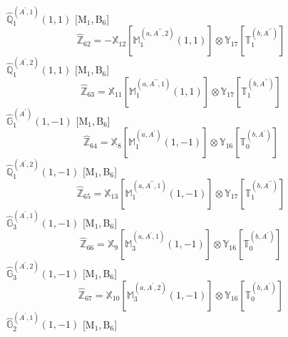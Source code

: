 \documentclass[fleqn,10pt,landscape]{article}
\begin{document}
\begin{itemize}
\begin{dmath*}
\end{dmath*}
\vspace{4mm}
\noindent {} $\,\,\,\hat{\mathbb{Q}}_{1}^{(A^{\prime},1)}(1,1)$ [M$_{1}$,\,B$_{6}$]
\begin{dmath*}
\hat{\mathbb{Z}}_{62}=- \mathbb{X}_{12}[\mathbb{M}_{1}^{(a,A^{\prime\prime},2)}(1,1)] \otimes\mathbb{Y}_{17}[\mathbb{T}_{1}^{(b,A^{\prime\prime})}]
\end{dmath*}
\vspace{4mm}
\noindent {} $\,\,\,\hat{\mathbb{Q}}_{1}^{(A^{\prime},2)}(1,1)$ [M$_{1}$,\,B$_{6}$]
\begin{dmath*}
\hat{\mathbb{Z}}_{63}=\mathbb{X}_{11}[\mathbb{M}_{1}^{(a,A^{\prime\prime},1)}(1,1)] \otimes\mathbb{Y}_{17}[\mathbb{T}_{1}^{(b,A^{\prime\prime})}]
\end{dmath*}
\vspace{4mm}
\noindent {} $\,\,\,\hat{\mathbb{G}}_{1}^{(A^{\prime})}(1,-1)$ [M$_{1}$,\,B$_{6}$]
\begin{dmath*}
\hat{\mathbb{Z}}_{64}=\mathbb{X}_{8}[\mathbb{M}_{1}^{(a,A^{\prime})}(1,-1)] \otimes\mathbb{Y}_{16}[\mathbb{T}_{0}^{(b,A^{\prime})}]
\end{dmath*}
\vspace{4mm}
\noindent {} $\,\,\,\hat{\mathbb{Q}}_{1}^{(A^{\prime},2)}(1,-1)$ [M$_{1}$,\,B$_{6}$]
\begin{dmath*}
\hat{\mathbb{Z}}_{65}=\mathbb{X}_{13}[\mathbb{M}_{1}^{(a,A^{\prime\prime},1)}(1,-1)] \otimes\mathbb{Y}_{17}[\mathbb{T}_{1}^{(b,A^{\prime\prime})}]
\end{dmath*}
\vspace{4mm}
\noindent {} $\,\,\,\hat{\mathbb{G}}_{3}^{(A^{\prime},1)}(1,-1)$ [M$_{1}$,\,B$_{6}$]
\begin{dmath*}
\hat{\mathbb{Z}}_{66}=\mathbb{X}_{9}[\mathbb{M}_{3}^{(a,A^{\prime},1)}(1,-1)] \otimes\mathbb{Y}_{16}[\mathbb{T}_{0}^{(b,A^{\prime})}]
\end{dmath*}
\vspace{4mm}
\noindent {} $\,\,\,\hat{\mathbb{G}}_{3}^{(A^{\prime},2)}(1,-1)$ [M$_{1}$,\,B$_{6}$]
\begin{dmath*}
\hat{\mathbb{Z}}_{67}=\mathbb{X}_{10}[\mathbb{M}_{3}^{(a,A^{\prime},2)}(1,-1)] \otimes\mathbb{Y}_{16}[\mathbb{T}_{0}^{(b,A^{\prime})}]
\end{dmath*}
\vspace{4mm}
\noindent {} $\,\,\,\hat{\mathbb{G}}_{2}^{(A^{\prime},1)}(1,-1)$ [M$_{1}$,\,B$_{6}$]
\begin{dmath*}

\end{dmath*}
\end{itemize}
\end{document}
